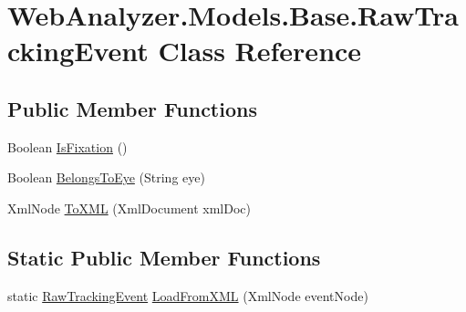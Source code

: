 \hypertarget{class_web_analyzer_1_1_models_1_1_base_1_1_raw_tracking_event}{}\section{Web\+Analyzer.\+Models.\+Base.\+Raw\+Tracking\+Event Class Reference}
\label{class_web_analyzer_1_1_models_1_1_base_1_1_raw_tracking_event}
\subsection*{Public Member Functions}
\begin{DoxyCompactItemize}
\item 
Boolean \hyperlink{class_web_analyzer_1_1_models_1_1_base_1_1_raw_tracking_event_a061ad649c7d39dba8fa0f8919a13ca49}{Is\+Fixation} ()
\item 
Boolean \hyperlink{class_web_analyzer_1_1_models_1_1_base_1_1_raw_tracking_event_a4a77576729765b02ffe84d60cdff6363}{Belongs\+To\+Eye} (String eye)
\item 
Xml\+Node \hyperlink{class_web_analyzer_1_1_models_1_1_base_1_1_raw_tracking_event_ac1deb430c3bf16edc018c66ec2d9f9e2}{To\+X\+M\+L} (Xml\+Document xml\+Doc)
\end{DoxyCompactItemize}
\subsection*{Static Public Member Functions}
\begin{DoxyCompactItemize}
\item 
static \hyperlink{class_web_analyzer_1_1_models_1_1_base_1_1_raw_tracking_event}{Raw\+Tracking\+Event} \hyperlink{class_web_analyzer_1_1_models_1_1_base_1_1_raw_tracking_event_aafceb7a390ce8b6b09d5f46970ae6f91}{Load\+From\+X\+M\+L} (Xml\+Node event\+Node)
\end{DoxyCompactItemize}
